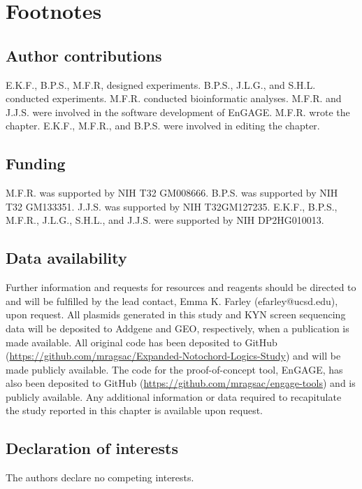 \section{Footnotes}

\subsection{Author contributions}
E.K.F., B.P.S., M.F.R, designed experiments. B.P.S., J.L.G., and S.H.L. conducted experiments. M.F.R. conducted bioinformatic analyses. M.F.R. and J.J.S. were involved in the software development of EnGAGE. M.F.R. wrote the chapter. E.K.F., M.F.R., and B.P.S. were involved in editing the chapter. 

\subsection{Funding}
M.F.R. was supported by NIH T32 GM008666. B.P.S. was supported by NIH T32 GM133351. J.J.S. was supported by NIH T32GM127235. E.K.F., B.P.S., M.F.R., J.L.G., S.H.L., and J.J.S. were supported by NIH DP2HG010013.

\subsection{Data availability}
Further information and requests for resources and reagents should be directed to and will be fulfilled by the lead contact, Emma K. Farley (efarley@ucsd.edu), upon request. All plasmids generated in this study and KYN screen sequencing data will be deposited to Addgene and GEO, respectively, when a publication is made available. All original code has been deposited to GitHub (\href{https://github.com/mragsac/Expanded-Notochord-Logics-Study}{https://github.com/mragsac/Expanded-Notochord-Logics-Study}) and will be made publicly available. The code for the proof-of-concept tool, EnGAGE, has also been deposited to GitHub (\href{https://github.com/mragsac/engage-tools}{https://github.com/mragsac/engage-tools}) and is publicly available. Any additional information or data required to recapitulate the study reported in this chapter is available upon request.

\subsection{Declaration of interests}
The authors declare no competing interests.

